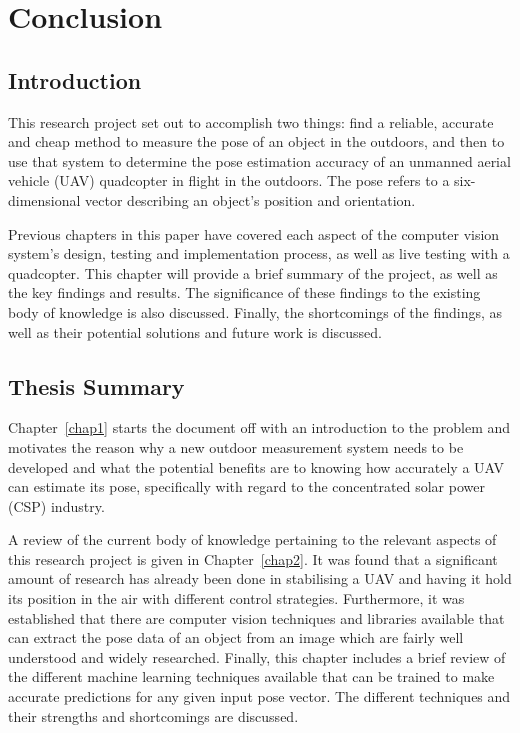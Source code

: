 \chapter{Conclusion}
\label{chap6}

\section{Introduction}

This research project set out to accomplish two things: find a reliable, accurate and cheap method to measure the pose of an object in the outdoors, and then to use that system to determine the pose estimation accuracy of an unmanned aerial vehicle (UAV) quadcopter in flight in the outdoors. The pose refers to a six-dimensional vector describing an object's position and orientation. 

Previous chapters in this paper have covered each aspect of the computer vision system's design, testing and implementation process, as well as live testing with a quadcopter. This chapter will provide a brief summary of the project, as well as the key findings and results. The significance of these findings to the existing body of knowledge is also discussed. Finally, the shortcomings of the findings, as well as their potential solutions and future work is discussed. 

\section{Thesis Summary}

Chapter~\ref{chap1} starts the document off with an introduction to the problem and motivates the reason why a new outdoor measurement system needs to be developed and what the potential benefits are to knowing how accurately a UAV can estimate its pose, specifically with regard to the concentrated solar power (CSP) industry.  

A review of the current body of knowledge pertaining to the relevant aspects of this research project is given in Chapter~\ref{chap2}. It was found that a significant amount of research has already been done in stabilising a UAV and having it hold its position in the air with different control strategies. Furthermore, it was established that there are computer vision techniques and libraries available that can extract the pose data of an object from an image which are fairly well understood and widely researched. Finally, this chapter includes a brief review of the different machine learning techniques available that can be trained to make accurate predictions for any given input pose vector. The different techniques and their strengths and shortcomings are discussed.  

